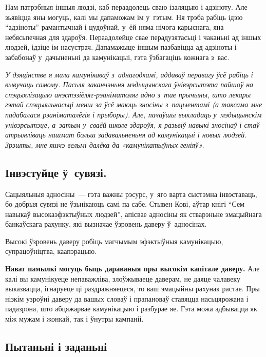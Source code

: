 Нам патрэбныя іншыя людзі, каб пераадолець сваю ізаляцыю і адзіноту. Але зьявіцца яны могуць, калі мы дапаможам ім у~гэтым. Ня трэба рабіць ідэю ``адзіноты'' рамантычнай і цудоўнай, у~ёй няма нічога карыснага, яна небясьпечная для здароўя. Пераадолейце свае перадузятасьці і чаканьні ад іншых людзей, ідзіце ім насустрач. Дапамажыце іншым пазбавіцца ад адзіноты і забабонаў у~дачыненьні да камунікацыі, гэта ўзбагаціць кожнага з~вас.

\emph{У дзяцінстве я мала камунікаваў з~аднагодкамі, аддаваў перавагу ўсё рабіць і вывучаць самому. Пасьля заканчэньня мэдыцынскага ўнівэрсытэта пайшоў на спэцыялізацыю анэстэзіёляг-рэаніматоляг адно з~тае прычыны, што лекары гэтай спэцыяльнасьці менш за ўсё маюць зносіны з~пацыентамі (а таксама мне падабалася рэаніматалёгія і прыборы). Але, пачаўшы выкладаць у~мэдыцынскім унівэрсытэце, а~затым у~сваёй школе здароўя, я разьвіў навыкі зносінаў і стаў атрымліваць нашмат больш задавальненьня ад камунікацыі і новых людзей. Зрэшты, мне яшчэ вельмі далёка да «камунікатыўных геніяў».}

\subsection*{Інвэстуйце ў~сувязі.}

Сацыяльныя адносіны~--- гэта важны рэсурс, у~яго варта сыстэмна інвэставаць, бо добрыя сувязі не ўзьнікаюць самі па сабе. Стывен Кові, аўтар кнігі ``Сем навыкаў высокаэфэктыўных людзей'', апісвае адносіны як стварэньне эмацыйнага банкаўскага рахунку, які вызначае ўзровень даверу ў~адносінах.


Высокі ўзровень даверу робіць магчымым эфэктыўныя камунікацыю, супрацоўніцтва, каапэрацыю.

\textbf{Нават памылкі могуць быць дараваныя пры высокім капітале даверу.} Але калі вы камунікуеце непаважліва, злоўжываеце даверам, не даяце чалавеку выказвацца, ігнаруеце ці раздражняецеся, то ваш эмацыйны рахунак растае. Пры нізкім узроўні даверу да вашых словаў і прапановаў ставяцца насьцярожана і падазрона, што абцяжарвае камунікацыю і разбурае яе. Гэта можа адбывацца як між мужам і жонкай, так і ўнутры кампаніі.

\subsection*{Пытаньні і заданьні}

